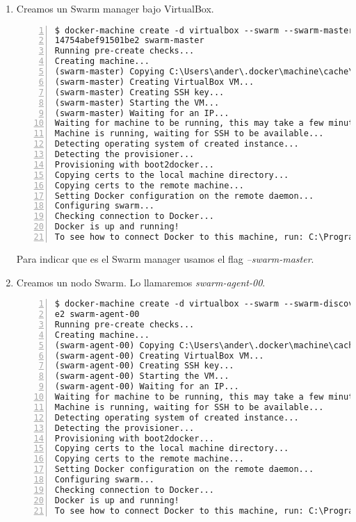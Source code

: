 			\begin{enumerate}
				\item Creamos un Swarm manager bajo VirtualBox.
				\begin{lstlisting}[style=consola,numbers=left]
$ docker-machine create -d virtualbox --swarm --swarm-master --swarm-discovery token://dc60acd12fc3a6b
14754abef91501be2 swarm-master
Running pre-create checks...
Creating machine...
(swarm-master) Copying C:\Users\ander\.docker\machine\cache\boot2docker.iso to C:\Users\ander\.docker\machine\machines\swarm-master\boot2docker.iso...
(swarm-master) Creating VirtualBox VM...
(swarm-master) Creating SSH key...
(swarm-master) Starting the VM...
(swarm-master) Waiting for an IP...
Waiting for machine to be running, this may take a few minutes...
Machine is running, waiting for SSH to be available...
Detecting operating system of created instance...
Detecting the provisioner...
Provisioning with boot2docker...
Copying certs to the local machine directory...
Copying certs to the remote machine...
Setting Docker configuration on the remote daemon...
Configuring swarm...
Checking connection to Docker...
Docker is up and running!
To see how to connect Docker to this machine, run: C:\Program Files\Docker Toolbox\docker-machine.exe env swarm-master
				\end{lstlisting}
				
				Para indicar que es el Swarm manager usamos el flag \textit{--swarm-master}.
				
				\item Creamos un nodo Swarm. Lo llamaremos \textit{swarm-agent-00}.
				\begin{lstlisting}[style=consola,numbers=left]
$ docker-machine create -d virtualbox --swarm --swarm-discovery token://dc60acd12fc3a6b14754abef91501b
e2 swarm-agent-00
Running pre-create checks...
Creating machine...
(swarm-agent-00) Copying C:\Users\ander\.docker\machine\cache\boot2docker.iso to C:\Users\ander\.docker\machine\machines\swarm-agent-00\boot2docker.iso...
(swarm-agent-00) Creating VirtualBox VM...
(swarm-agent-00) Creating SSH key...
(swarm-agent-00) Starting the VM...
(swarm-agent-00) Waiting for an IP...
Waiting for machine to be running, this may take a few minutes...
Machine is running, waiting for SSH to be available...
Detecting operating system of created instance...
Detecting the provisioner...
Provisioning with boot2docker...
Copying certs to the local machine directory...
Copying certs to the remote machine...
Setting Docker configuration on the remote daemon...
Configuring swarm...
Checking connection to Docker...
Docker is up and running!
To see how to connect Docker to this machine, run: C:\Program Files\Docker Toolbox\docker-machine.exe env swarm-agent-00
				\end{lstlisting}


\end{enumerate}
